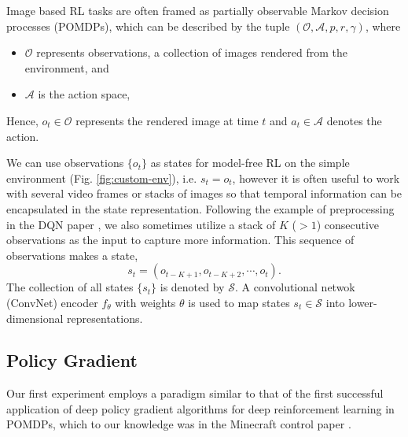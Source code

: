 \documentclass[11pt]{article}
\begin{document}
Image based RL tasks are often framed as partially observable Markov decision processes (POMDPs), which can be described by the tuple $(\mathcal{O}, \mathcal{A}, p, r, \gamma)$, where 
\begin{itemize}
    \item $\mathcal{O}$ represents observations, a collection of images rendered from the environment, and 
    \item $\mathcal{A}$ is the action space,
\end{itemize}
Hence, $o_t \in \mathcal{O}$ represents the rendered image at time $t$ and $a_t\in \mathcal{A}$ denotes the action.

We can use observations $\{o_t\}$ as states for model-free RL on the simple environment (Fig. \ref{fig:custom-env}), i.e. $s_t = o_t$, however it is often useful to work with several video frames or stacks of images so that temporal information can be encapsulated in the state representation. Following the example of preprocessing in the DQN paper \cite{mnih2015human}, we also sometimes utilize a stack of $K$ ($>1$) consecutive observations as the input to capture more information. This sequence of observations makes a state, 
\[s_t = (o_{t-K+1}, o_{t-K+2}, \cdots, o_t).\] 
The collection of all states $\{s_t\}$ is denoted by $\mathcal{S}$. A convolutional netwok (ConvNet) encoder  $f_\theta$ with weights $\theta$ is used to map states $s_t\in \mathcal{S}$ into lower-dimensional representations. 

\subsection{Policy Gradient}
Our first experiment employs a paradigm similar to that of the first successful application of deep policy gradient algorithms for deep reinforcement learning in POMDPs, which to our knowledge was in the Minecraft control paper \cite{oh2016control}. 
\end{document}
